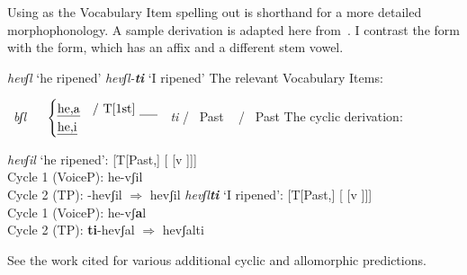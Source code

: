 \begin{exe}
\begin{xlist}
\begin{xlist}
\begin{exe}
\begin{exe}
\begin{xlist}
\begin{exe}
\begin{xlist}
\begin{exe}
\begin{xlist}
\begin{xlist}
\begin{exe}
\begin{xlist}
\begin{exe}
\begin{xlist}
\begin{exe}
\begin{xlist}
\begin{exe}
\begin{exe}
\begin{exe}
\begin{xlist}
\begin{exe}
\begin{exe}
\begin{xlist}
\begin{xlist}
\begin{exe}
\begin{xlist}
\begin{exe}
\begin{exe}
\begin{xlist}
\begin{exe}
Using {\thif} as the Vocabulary Item spelling out {\vd} is shorthand for a more detailed morphophonology. A sample derivation is adapted here from~\cite{kastner18nllt}. I contrast the  form with the  form, which has an affix and a different stem vowel.

 \begin{exe}
 \ex  
 \begin{xlist} 
 	\ex  \emph{hevʃl} `he ripened' 
 	\ex  \emph{hevʃl-\textbf{ti}} `I ripened' 
 \z
\z 
The relevant Vocabulary Items:

 \begin{exe}
 \ex  
 \begin{xlist} 
 	\ex  {} \lra~\emph{bʃl} 
 	\ex  	\vd~\lra~ $\begin{cases} 
			\text{\emph{he,a}} & \text{/ T[1st] \trace}\\
			\text{\emph{he,i}}
			\end{cases}$\label{r1:4:4}
 	 \lra~\emph{ti} / \trace~Past 
 	\ex  {} \lra~{\zero} / \trace~Past 
 \z
\z 
The cyclic derivation:

 \begin{exe}
 \ex  
 \begin{xlist} 
 	\ex  \emph{hevʃil} `he ripened': [T[Past,] [{\vd} [v ]]] \\
	Cycle 1 (VoiceP): he-vʃil\\
	Cycle 2 (TP): {\zero}-hevʃil $\Rightarrow$ hevʃil
 	\ex  \emph{hevʃl\textbf{ti}} `I ripened': [T[Past,] [{\vd} [v ]]]  \\
	Cycle 1 (VoiceP): he-vʃ\textbf{a}l\\
	Cycle 2 (TP): \textbf{ti}-hevʃal $\Rightarrow$ hevʃalti
 \z
\z 	

See the work cited for various additional cyclic and allomorphic predictions.


\end{xlist}
\end{exe}
\end{xlist}
\end{exe}
\end{xlist}
\end{exe}
\end{exe}
\end{xlist}
\end{exe}
\end{exe}
\end{xlist}
\end{exe}
\end{xlist}
\end{xlist}
\end{exe}
\end{exe}
\end{xlist}
\end{exe}
\end{exe}
\end{exe}
\end{xlist}
\end{exe}
\end{xlist}
\end{exe}
\end{xlist}
\end{exe}
\end{xlist}
\end{xlist}
\end{exe}
\end{xlist}
\end{exe}
\end{xlist}
\end{exe}
\end{exe}
\end{xlist}
\end{xlist}
\end{exe}
